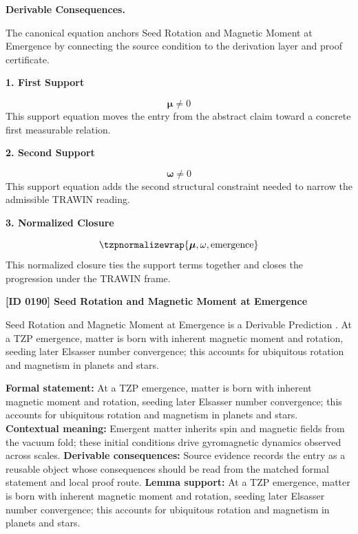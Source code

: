 \par\vspace{0.35em}
\noindent\textbf{Derivable Consequences.}\quad
\begingroup
\footnotesize
\raggedright
The canonical equation anchors Seed Rotation and Magnetic Moment at Emergence by connecting the source condition to the derivation layer and proof certificate.
\par\endgroup

\noindent\textbf{1. First Support}\par
\[
\boldsymbol{\mu} \neq 0
\]
\noindent This support equation moves the entry from the abstract claim toward a concrete first measurable relation.\par
\noindent\textbf{2. Second Support}\par
\[
\mathbf{\omega} \neq 0
\]
\noindent This support equation adds the second structural constraint needed to narrow the admissible TRAWIN reading.\par
\noindent\textbf{3. Normalized Closure}\par
\[
\tzpnormalizewrap{\boldsymbol{\mu},\mathbf{\omega},\text{emergence}}
\]
\noindent This normalized closure ties the support terms together and closes the progression under the TRAWIN frame.\par

\clearpage
\noindent\textbf{[ID 0190] Seed Rotation and Magnetic Moment at Emergence}\par
\vspace{0.35em}
\begingroup\small
{}
Seed Rotation and Magnetic Moment at Emergence is a Derivable Prediction  . At a TZP emergence, matter is born with inherent magnetic moment and rotation, seeding later Elsasser number convergence; this accounts for ubiquitous rotation and magnetism in planets and stars.  

\begingroup\footnotesize\setlength{\emergencystretch}{3em}\sloppy
\textbf{Formal statement:} At a TZP emergence, matter is born with inherent magnetic moment and rotation, seeding later Elsasser number convergence; this accounts for ubiquitous rotation and magnetism in planets and stars.  
\textbf{Contextual meaning:} Emergent matter inherits spin and magnetic fields from the vacuum fold; these initial conditions drive gyromagnetic dynamics observed across scales.
\textbf{Derivable consequences:} Source evidence records the entry as a reusable object whose consequences should be read from the matched formal statement and local proof route.
\textbf{Lemma support:} At a TZP emergence, matter is born with inherent magnetic moment and rotation, seeding later Elsasser number convergence; this accounts for ubiquitous rotation and magnetism in planets and stars.  \par
\endgroup

